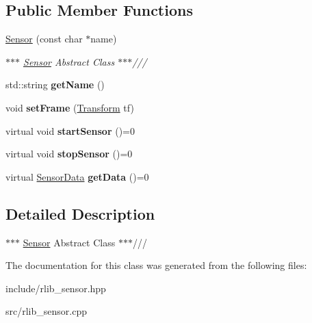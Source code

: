 \subsection*{Public Member Functions}
\begin{DoxyCompactItemize}
\item 
\hypertarget{classrlib_1_1Sensor_a2c91acd4bed299a37f744f67e3ed1c98}{\hyperlink{classrlib_1_1Sensor_a2c91acd4bed299a37f744f67e3ed1c98}{Sensor} (const char $\ast$name)}\label{classrlib_1_1Sensor_a2c91acd4bed299a37f744f67e3ed1c98}

\begin{DoxyCompactList}\small\item\em $\ast$$\ast$$\ast$ \hyperlink{classrlib_1_1Sensor}{Sensor} Abstract Class $\ast$$\ast$$\ast$/// \end{DoxyCompactList}\item 
\hypertarget{classrlib_1_1Sensor_a398dc38404983a823704271bd78434dd}{std\-::string {\bfseries get\-Name} ()}\label{classrlib_1_1Sensor_a398dc38404983a823704271bd78434dd}

\item 
\hypertarget{classrlib_1_1Sensor_a23e53ef67e2ed8c566122576894bba21}{void {\bfseries set\-Frame} (\hyperlink{classrlib_1_1Transform}{Transform} tf)}\label{classrlib_1_1Sensor_a23e53ef67e2ed8c566122576894bba21}

\item 
\hypertarget{classrlib_1_1Sensor_a671966372280f694136d6b0880fdce33}{virtual void {\bfseries start\-Sensor} ()=0}\label{classrlib_1_1Sensor_a671966372280f694136d6b0880fdce33}

\item 
\hypertarget{classrlib_1_1Sensor_a14db3d6d3bdcac79411c1abbb6439f41}{virtual void {\bfseries stop\-Sensor} ()=0}\label{classrlib_1_1Sensor_a14db3d6d3bdcac79411c1abbb6439f41}

\item 
\hypertarget{classrlib_1_1Sensor_aff2b43bfdd9e41444000924ba72ef9c6}{virtual \hyperlink{classrlib_1_1SensorData}{Sensor\-Data} {\bfseries get\-Data} ()=0}\label{classrlib_1_1Sensor_aff2b43bfdd9e41444000924ba72ef9c6}

\end{DoxyCompactItemize}


\subsection{Detailed Description}
$\ast$$\ast$$\ast$ \hyperlink{classrlib_1_1Sensor}{Sensor} Abstract Class $\ast$$\ast$$\ast$/// 

The documentation for this class was generated from the following files\-:\begin{DoxyCompactItemize}
\item 
include/rlib\-\_\-sensor.\-hpp\item 
src/rlib\-\_\-sensor.\-cpp\end{DoxyCompactItemize}

